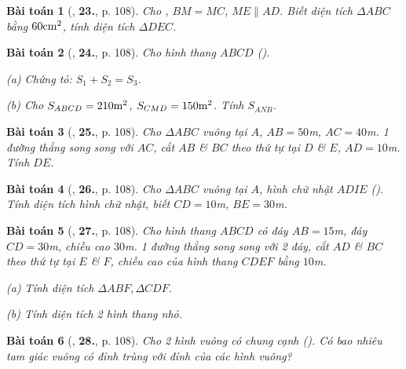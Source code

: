 \documentclass{article}
\numberwithin{equation}{section}
\newtheorem{baitoan}{Bài toán}[section]
\begin{document}
\begin{baitoan}[\cite{Binh_Toan_6_tap_1}, \textbf{23.}, p. 108]
	Cho \cite[Hình 42, p. 108]{Binh_Toan_6_tap_1}, $BM = MC$, $ME\parallel AD$. Biết diện tích $\Delta ABC$ bằng $60{\rm cm}^2$, tính diện tích $\Delta DEC$.
\end{baitoan}

\begin{baitoan}[\cite{Binh_Toan_6_tap_1}, \textbf{24.}, p. 108]
	Cho hình thang $ABCD$ (\cite[Hình 43, p. 108]{Binh_Toan_6_tap_1}).
	\begin{enumerate*}
		\item[(a)] Chứng tỏ: $S_1 + S_2 = S_3$.
		\item[(b)] Cho $S_{ABCD} = 210{\rm m}^2$, $S_{CMD} = 150{\rm m}^2$. Tính $S_{ANB}$.
	\end{enumerate*}
\end{baitoan}

\begin{baitoan}[\cite{Binh_Toan_6_tap_1}, \textbf{25.}, p. 108]
	Cho $\Delta ABC$ vuông tại $A$, $AB = 50$\emph{m}, $AC = 40$\emph{m}. 1 đường thẳng song song với $AC$, cắt $AB$ \& $BC$ theo thứ tự tại $D$ \& $E$, $AD = 10$\emph{m}. Tính $DE$.
\end{baitoan}

\begin{baitoan}[\cite{Binh_Toan_6_tap_1}, \textbf{26.}, p. 108]
	Cho $\Delta ABC$ vuông tại $A$, hình chữ nhật $ADIE$ (\cite[Hình 44, p. 108]{Binh_Toan_6_tap_1}). Tính diện tích hình chữ nhật, biết $CD = 10$\emph{m}, $BE = 30$\emph{m}.
\end{baitoan}

\begin{baitoan}[\cite{Binh_Toan_6_tap_1}, \textbf{27.}, p. 108]
	Cho hình thang $ABCD$ có đáy $AB = 15$\emph{m}, đáy $CD = 30$\emph{m}, chiều cao $30$\emph{m}. 1 đường thẳng song song với 2 đáy, cắt $AD$ \& $BC$ theo thứ tự tại $E$ \& $F$, chiều cao của hình thang $CDEF$ bằng $10$\emph{m}.
	\begin{enumerate*}
		\item[(a)] Tính diện tích $\Delta ABF,\Delta CDF$.
		\item[(b)] Tính diện tích 2 hình thang nhỏ.	
	\end{enumerate*}
\end{baitoan}

\begin{baitoan}[\cite{Binh_Toan_6_tap_1}, \textbf{28.}, p. 108]
	Cho 2 hình vuông có chung cạnh (\cite[Hình 45, p. 108]{Binh_Toan_6_tap_1}). Có bao nhiêu tam giác vuông có đỉnh trùng với đỉnh của các hình vuông?
\end{baitoan}
\end{document}

